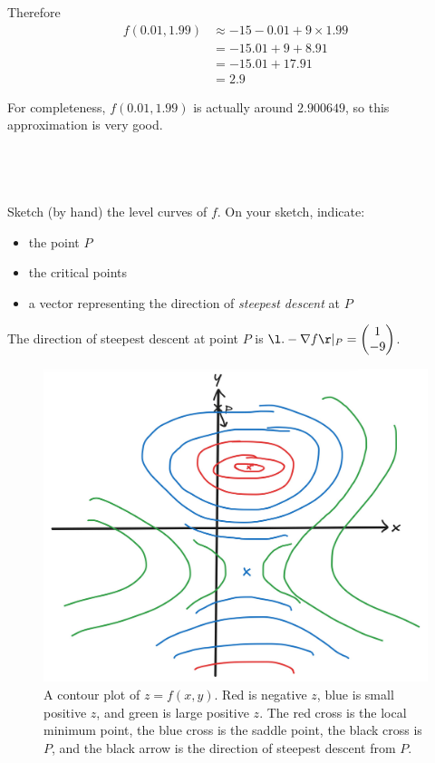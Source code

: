 \documentclass[a4paper]{article}
\begin{document}
Therefore \begin{align*}
f(0.01, 1.99) &\approx -15 - 0.01 + 9 \times 1.99\\
&= -15.01 + 9 + 8.91\\
&= -15.01 + 17.91\\
&= 2.9
\end{align*}

For completeness, $f(0.01, 1.99)$ is actually around $2.900649$, so this approximation is very good.

\subsection{~} %

\begin{questionbody}
Sketch (by hand) the level curves of $f$. On your sketch, indicate: \begin{itemize}[nosep]
\item the point $P$
\item the critical points
\item a vector representing the direction of \textit{steepest descent} at $P$
\end{itemize}
\end{questionbody}

The direction of steepest descent at point $P$ is $\l. -\nabla f \r|_P = \begin{pmatrix}1\\ -9\end{pmatrix}$.

\begin{figure}[h]
	\centering
	\includegraphics[scale=0.4]{Q2c}
	\caption{A contour plot of $z=f(x,y)$. Red is negative $z$, blue is small positive $z$, and green is large positive $z$. The red cross is the local minimum point, the blue cross is the saddle point, the black cross is $P$, and the black arrow is the direction of steepest descent from $P$.}
\end{figure}
\end{document}
